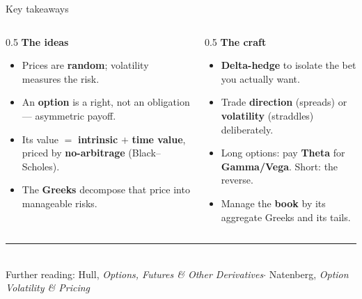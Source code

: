 \documentclass[11pt,aspectratio=169]{beamer}
\begin{document}
\begin{frame}{Key takeaways}
  \begin{columns}[T]
    \begin{column}{0.5\textwidth}
      \textbf{\color{accent}The ideas}
      \begin{itemize}\small
        \item Prices are \textbf{random}; volatility measures the risk.
        \item An \textbf{option} is a right, not an obligation — asymmetric payoff.
        \item Its value $=$ \textbf{intrinsic} $+$ \textbf{time value}, priced by \textbf{no-arbitrage} (Black--Scholes).
        \item The \textbf{Greeks} decompose that price into manageable risks.
      \end{itemize}
    \end{column}
    \begin{column}{0.5\textwidth}
      \textbf{\color{accent}The craft}
      \begin{itemize}\small
        \item \textbf{Delta-hedge} to isolate the bet you actually want.
        \item Trade \textbf{direction} (spreads) or \textbf{volatility} (straddles) deliberately.
        \item Long options: pay \textbf{Theta} for \textbf{Gamma/Vega}. Short: the reverse.
        \item Manage the \textbf{book} by its aggregate Greeks and its tails.
      \end{itemize}
    \end{column}
  \end{columns}
  \vfill
  \begin{center}
    {\color{accent}\rule{0.5\textwidth}{1pt}}\\[0.5em]
    \small\color{muted}Further reading: Hull, \emph{Options, Futures \& Other Derivatives}\;$\cdot$\;
    Natenberg, \emph{Option Volatility \& Pricing}
  \end{center}
\end{frame}
\end{document}
